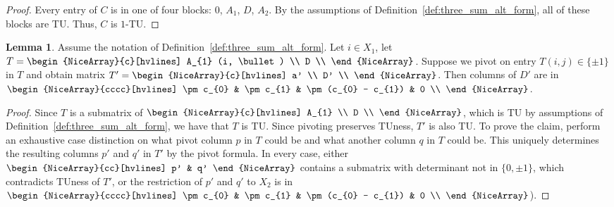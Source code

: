 \documentclass{article}
\theoremstyle{definition}
\newtheorem{lemma}[theorem]{Lemma}
\begin{document}
\begin{proof}
    Every entry of $C$ is in one of four blocks: $0$, $A_{1}$, $D$, $A_{2}$. By the assumptions of Definition~\ref{def:three_sum_alt_form}, all of these blocks are TU. Thus, $C$ is $1$-TU.
\end{proof}

\begin{lemma}\label{lem:three_sum_alt_form_pivot}
    Assume the notation of Definition~\ref{def:three_sum_alt_form}. Let $i \in X_{1}$, let $T = \begin{NiceArray}{c}[hvlines] A_{1} (i, \bullet) \\ D \\ \end{NiceArray}$. Suppose we pivot on entry $T (i, j) \in \{\pm 1\}$ in $T$ and obtain matrix $T' = \begin{NiceArray}{c}[hvlines] a' \\ D' \\ \end{NiceArray}$. Then columns of $D'$ are in $\begin{NiceArray}{cccc}[hvlines] \pm c_{0} & \pm c_{1} & \pm (c_{0} - c_{1}) & 0 \\ \end{NiceArray}$.
\end{lemma}

\begin{proof}
    Since $T$ is a submatrix of $\begin{NiceArray}{c}[hvlines] A_{1} \\ D \\ \end{NiceArray}$, which is TU by assumptions of Definition~\ref{def:three_sum_alt_form}, we have that $T$ is TU. Since pivoting preserves TUness, $T'$ is also TU. To prove the claim, perform an exhaustive case distinction on what pivot column $p$ in $T$ could be and what another column $q$ in $T$ could be. This uniquely determines the resulting columns $p'$ and $q'$ in $T'$ by the pivot formula. In every case, either $\begin{NiceArray}{cc}[hvlines] p' & q' \end{NiceArray}$ contains a submatrix with determinant not in $\{0, \pm 1\}$, which contradicts TUness of $T'$, or the restriction of $p'$ and $q'$ to $X_{2}$ is in $\begin{NiceArray}{cccc}[hvlines] \pm c_{0} & \pm c_{1} & \pm (c_{0} - c_{1}) & 0 \\ \end{NiceArray}$).
\end{proof}
\end{document}
